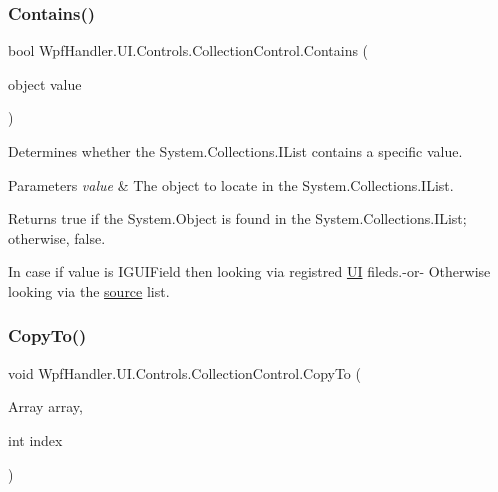 \subsubsection{\texorpdfstring{Contains()}{Contains()}}
{\footnotesize\ttfamily bool Wpf\+Handler.\+U\+I.\+Controls.\+Collection\+Control.\+Contains (\begin{DoxyParamCaption}\item[{object}]{value }\end{DoxyParamCaption})}



Determines whether the System.\+Collections.\+I\+List contains a specific value. 


\begin{DoxyParams}{Parameters}
{\em value} & The object to locate in the System.\+Collections.\+I\+List.\\
\hline
\end{DoxyParams}
\begin{DoxyReturn}{Returns}
true if the System.\+Object is found in the System.\+Collections.\+I\+List; otherwise, false. 
\end{DoxyReturn}


In case if value is I\+G\+U\+I\+Field then looking via registred \mbox{\hyperlink{namespace_wpf_handler_1_1_u_i}{UI}} fileds.-\/or-\/ Otherwise looking via the \mbox{\hyperlink{class_wpf_handler_1_1_u_i_1_1_controls_1_1_collection_control_a78ccfdc5208ab2306308d7356757f32f}{source}} list. \mbox{\label{class_wpf_handler_1_1_u_i_1_1_controls_1_1_collection_control_a1cf65910d88b69192fd7dd764a63609a}} 
\subsubsection{\texorpdfstring{Copy\+To()}{CopyTo()}}
{\footnotesize\ttfamily void Wpf\+Handler.\+U\+I.\+Controls.\+Collection\+Control.\+Copy\+To (\begin{DoxyParamCaption}\item[{Array}]{array,  }\item[{int}]{index }\end{DoxyParamCaption})}



